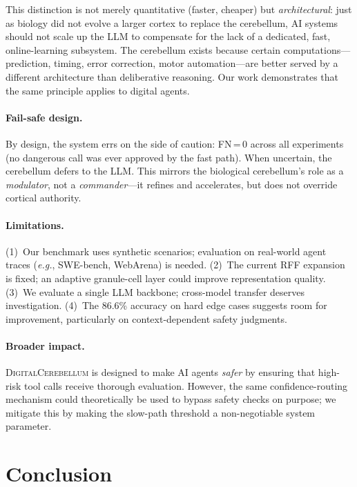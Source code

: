 \documentclass[11pt,a4paper]{article}
\newcommand{\eg}{\textit{e.g.}}
\newcommand{\cb}{\textsc{DigitalCerebellum}}
\begin{document}
This distinction is not merely quantitative (faster, cheaper) but \emph{architectural}: just as biology did not evolve a larger cortex to replace the cerebellum, AI systems should not scale up the LLM to compensate for the lack of a dedicated, fast, online-learning subsystem.
The cerebellum exists because certain computations---prediction, timing, error correction, motor automation---are better served by a different architecture than deliberative reasoning.
Our work demonstrates that the same principle applies to digital agents.

\paragraph{Fail-safe design.}
By design, the system errs on the side of caution: FN\,=\,0 across all experiments (no dangerous call was ever approved by the fast path).
When uncertain, the cerebellum defers to the LLM.
This mirrors the biological cerebellum's role as a \emph{modulator}, not a \emph{commander}---it refines and accelerates, but does not override cortical authority.

\paragraph{Limitations.}
(1)~Our benchmark uses synthetic scenarios; evaluation on real-world agent traces (\eg{}, SWE-bench, WebArena) is needed.
(2)~The current RFF expansion is fixed; an adaptive granule-cell layer could improve representation quality.
(3)~We evaluate a single LLM backbone; cross-model transfer deserves investigation.
(4)~The 86.6\% accuracy on hard edge cases suggests room for improvement, particularly on context-dependent safety judgments.

\paragraph{Broader impact.}
\cb{} is designed to make AI agents \emph{safer} by ensuring that high-risk tool calls receive thorough evaluation.
However, the same confidence-routing mechanism could theoretically be used to bypass safety checks on purpose; we mitigate this by making the slow-path threshold a non-negotiable system parameter.

\section{Conclusion}\label{sec:conclusion}
\end{document}
